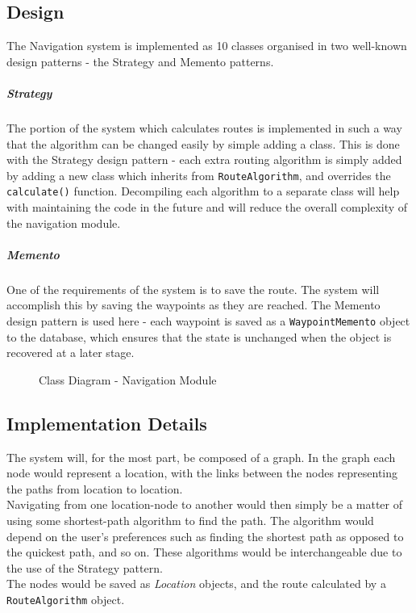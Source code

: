 \documentclass[english]{article}
\begin{document}
        \subsection{Design}
            The Navigation system is implemented as 10 classes organised in two well-known design patterns - the Strategy and Memento patterns.

            \subparagraph{Strategy}
            The portion of the system which calculates routes is implemented in such a way that the algorithm can be changed easily by simple adding a class. This is done with the Strategy design pattern - each extra routing algorithm is simply added by adding a new class which inherits from \texttt{RouteAlgorithm}, and overrides the \texttt{calculate()} function. Decompiling each algorithm to a separate class will help with maintaining the code in the future and will reduce the overall complexity of the navigation module.

            \subparagraph{Memento}
            One of the requirements of the system is to save the route. The system will accomplish this by saving the waypoints as they are reached. The Memento design pattern is used here - each waypoint is saved as a \texttt{WaypointMemento} object to the database, which ensures that the state is unchanged when the object is recovered at a later stage.

        \begin{figure}[H]
            \centering	            
            \centerline{}
            \caption{Class Diagram - Navigation Module}
        \end{figure}

        \subsection{Implementation Details}
            The system will, for the most part, be composed of a graph. In the graph each node would represent a location, with the links between the nodes representing the paths from location to location. \\
            Navigating from one location-node to another would then simply be a matter of using some shortest-path algorithm to find the path. The algorithm would depend on the user's preferences such as finding the shortest path as opposed to the quickest path, and so on. These algorithms would be interchangeable due to the use of the Strategy pattern. \\
            The nodes would be saved as \textit{Location} objects, and the route calculated by a \texttt{RouteAlgorithm} object.
\end{document}
